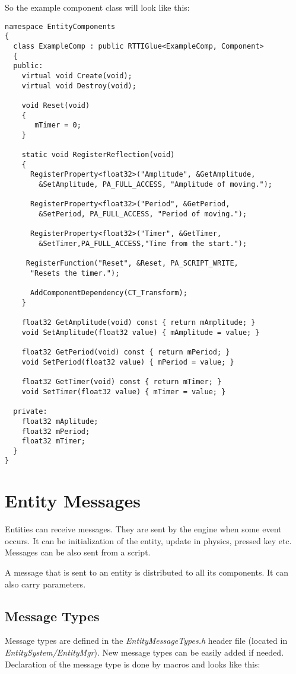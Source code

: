\documentclass[a4paper, 12pt]{report}
\begin{document}
So the example component class will look like this: 

\begin{verbatim}
namespace EntityComponents
{
  class ExampleComp : public RTTIGlue<ExampleComp, Component>
  {
  public:
    virtual void Create(void);
    virtual void Destroy(void);

    void Reset(void)
    {
       mTimer = 0;
    }

    static void RegisterReflection(void)
    {
      RegisterProperty<float32>("Amplitude", &GetAmplitude,
        &SetAmplitude, PA_FULL_ACCESS, "Amplitude of moving.");

      RegisterProperty<float32>("Period", &GetPeriod, 
        &SetPeriod, PA_FULL_ACCESS, "Period of moving.");

      RegisterProperty<float32>("Timer", &GetTimer, 
        &SetTimer,PA_FULL_ACCESS,"Time from the start.");

     RegisterFunction("Reset", &Reset, PA_SCRIPT_WRITE,
      "Resets the timer.");

      AddComponentDependency(CT_Transform);
    }

    float32 GetAmplitude(void) const { return mAmplitude; }
    void SetAmplitude(float32 value) { mAmplitude = value; }
		
    float32 GetPeriod(void) const { return mPeriod; }
    void SetPeriod(float32 value) { mPeriod = value; }
		
    float32 GetTimer(void) const { return mTimer; }
    void SetTimer(float32 value) { mTimer = value; }

  private:
    float32 mAplitude;
    float32 mPeriod;
    float32 mTimer;
  }
}
\end{verbatim}

\section{Entity Messages}

Entities can receive messages. They are sent by the engine when some event occurs. It can be initialization of the entity, update in physics, pressed key etc. Messages can be also sent from a script.

A message that is sent to an entity is distributed to all its components. It can also carry parameters.

\subsection{Message Types}
Message types are defined in the \emph{EntityMessageTypes.h} header file (located in \emph{EntitySystem/EntityMgr}). New message types can be easily added if needed. Declaration of the message type is done by macros and looks like this:
\end{document}
